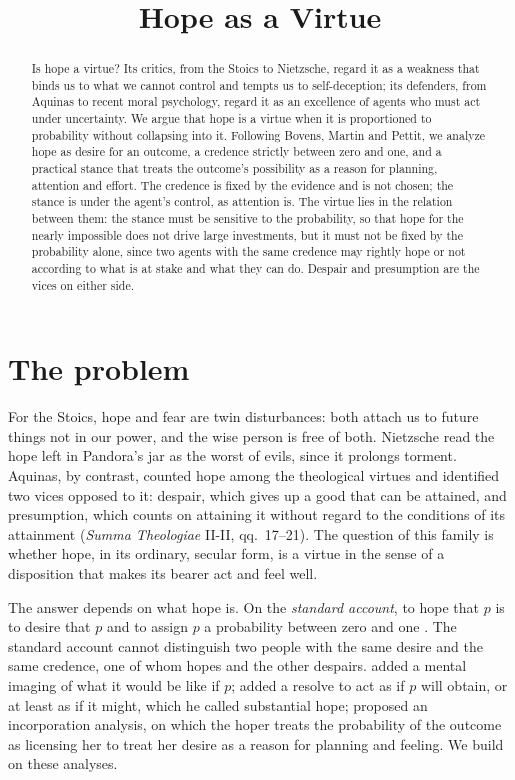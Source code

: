 \documentclass{situationist-preprint}
\title{Hope as a Virtue}
\begin{document}
\maketitle

\begin{abstract}
Is hope a virtue? Its critics, from the Stoics to Nietzsche, regard it as a weakness that binds us to what we cannot control and tempts us to self-deception; its defenders, from Aquinas to recent moral psychology, regard it as an excellence of agents who must act under uncertainty. We argue that hope is a virtue when it is proportioned to probability without collapsing into it. Following Bovens, Martin and Pettit, we analyze hope as desire for an outcome, a credence strictly between zero and one, and a practical stance that treats the outcome's possibility as a reason for planning, attention and effort. The credence is fixed by the evidence and is not chosen; the stance is under the agent's control, as attention is. The virtue lies in the relation between them: the stance must be sensitive to the probability, so that hope for the nearly impossible does not drive large investments, but it must not be fixed by the probability alone, since two agents with the same credence may rightly hope or not according to what is at stake and what they can do. Despair and presumption are the vices on either side.
\end{abstract}

\section{The problem}

For the Stoics, hope and fear are twin disturbances: both attach us to future things not in our power, and the wise person is free of both. Nietzsche read the hope left in Pandora's jar as the worst of evils, since it prolongs torment. Aquinas, by contrast, counted hope among the theological virtues and identified two vices opposed to it: despair, which gives up a good that can be attained, and presumption, which counts on attaining it without regard to the conditions of its attainment (\emph{Summa Theologiae} II-II, qq.~17--21). The question of this family is whether hope, in its ordinary, secular form, is a virtue in the sense of a disposition that makes its bearer act and feel well.

The answer depends on what hope is. On the \emph{standard account}, to hope that $p$ is to desire that $p$ and to assign $p$ a probability between zero and one \citep{Downie1963}. The standard account cannot distinguish two people with the same desire and the same credence, one of whom hopes and the other despairs. \citet{Bovens1999} added a mental imaging of what it would be like if $p$; \citet{Pettit2004} added a resolve to act as if $p$ will obtain, or at least as if it might, which he called substantial hope; \citet{Martin2014} proposed an incorporation analysis, on which the hoper treats the probability of the outcome as licensing her to treat her desire as a reason for planning and feeling. We build on these analyses.
\end{document}
